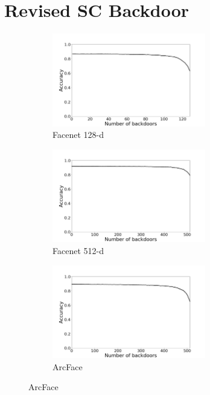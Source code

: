 \documentclass{article}
\theoremstyle{plain}
\theoremstyle{definition}
\theoremstyle{remark}
\begin{document}

\section{Revised SC Backdoor}
\begin{figure}[t!]
    \centering
    \begin{subfigure}[t]{0.45\textwidth}
        \centering
        \includegraphics[height=1.6in]{figures/normalised_attack_Facenet_opencv_cosine_128.png}
        \caption{Facenet 128-d}
    \end{subfigure}%
    \hfill 
    \begin{subfigure}[t]{0.45\textwidth}
        \centering
        \includegraphics[height=1.6in]{figures/normalised_attack_Facenet512_opencv_cosine_512.png}
        \caption{Facenet 512-d}
    \end{subfigure}
    \hfill 
    \begin{subfigure}[t]{0.45\textwidth}
        \centering
        \includegraphics[height=1.6in]{figures/normalised_attack_ArcFace_opencv_cosine_512.png}
        \caption{ArcFace}
    \end{subfigure}

\end{figure}
\end{document}
